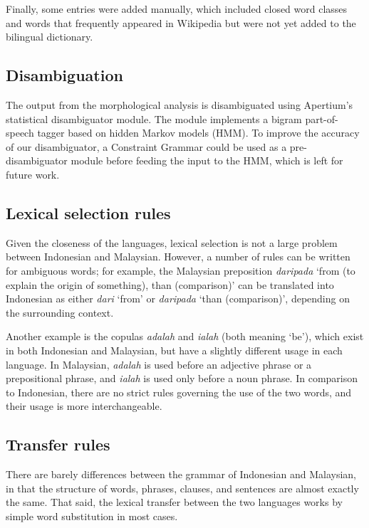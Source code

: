 \documentclass[10pt,a5paper,twoside]{article}
\begin{document}
Finally, some entries were added manually, which included closed word classes and words that frequently appeared in Wikipedia but were not yet added to the bilingual dictionary.

\subsection{Disambiguation}
The output from the morphological analysis is disambiguated using Apertium's statistical disambiguator module. The module implements a bigram part-of-speech tagger based on hidden Markov models (HMM). To improve the accuracy of our disambiguator, a Constraint Grammar \citep{Karlsson1990cg} could be used as a pre-disambiguator module before feeding the input to the HMM, which is left for future work.

\subsection{Lexical selection rules}
Given the closeness of the languages, lexical selection is not a large problem between Indonesian and Malaysian. However, a number of rules can be written for ambiguous words; for example, the Malaysian preposition \emph{daripada} `from (to explain the origin of something), than (comparison)' can be translated into Indonesian as either \emph{dari} `from' or \emph{daripada} `than (comparison)', depending on the surrounding context.

Another example is the copulas \emph{adalah} and \emph{ialah} (both meaning `be'), which exist in both Indonesian and Malaysian, but have a slightly different usage in each language. In Malaysian, \emph{adalah} is used before an adjective phrase or a prepositional phrase, and \emph{ialah} is used only before a noun phrase. In comparison to Indonesian, there are no strict rules governing the use of the two words, and their usage is more interchangeable.
\subsection{Transfer rules}
There are barely differences between the grammar of Indonesian and Malaysian, in that the structure of words, phrases, clauses, and sentences are almost exactly the same. That said, the lexical transfer between the two languages works by simple word substitution in most cases.
\end{document}
